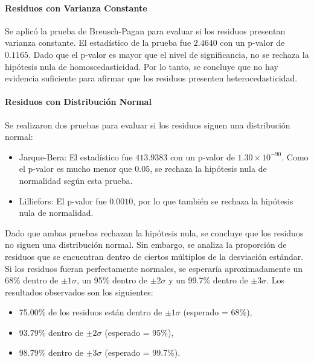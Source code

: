 \documentclass[12pt,letterpaper]{article}   %
\begin{document}
\paragraph{Residuos con Varianza Constante}
Se aplicó la prueba de Breusch-Pagan para evaluar si los residuos presentan varianza constante. El estadístico de la prueba fue $2.4640$ con un p-valor de $0.1165$. Dado que el p-valor es mayor que el nivel de significancia, no se rechaza la hipótesis nula de homoscedasticidad. Por lo tanto, se concluye que no hay evidencia suficiente para afirmar que los residuos presenten heterocedasticidad.

\paragraph{Residuos con Distribución Normal}
Se realizaron dos pruebas para evaluar si los residuos siguen una distribución normal:

\begin{itemize}
    \item Jarque-Bera: El estadístico fue $413.9383$ con un p-valor de $1.30 \times 10^{-90}$. Como el p-valor es mucho menor que $0.05$, se rechaza la hipótesis nula de normalidad según esta prueba.
    \item Lilliefors: El p-valor fue $0.0010$, por lo que también se rechaza la hipótesis nula de normalidad.
\end{itemize}

Dado que ambas pruebas rechazan la hipótesis nula, se concluye que los residuos no siguen una distribución normal. Sin embargo, se analiza la proporción de residuos que se encuentran dentro de ciertos múltiplos de la desviación estándar. Si los residuos fueran perfectamente normales, se esperaría aproximadamente un 68\% dentro de $\pm1\sigma$, un 95\% dentro de $\pm2\sigma$ y un 99.7\% dentro de $\pm3\sigma$. Los resultados observados son los siguientes:

\begin{itemize}
    \item 75.00\% de los residuos están dentro de $\pm1\sigma$ (esperado = 68\%),
    \item 93.79\% dentro de $\pm2\sigma$ (esperado = 95\%),
    \item 98.79\% dentro de $\pm3\sigma$ (esperado = 99.7\%).
\end{itemize}
\end{document}
